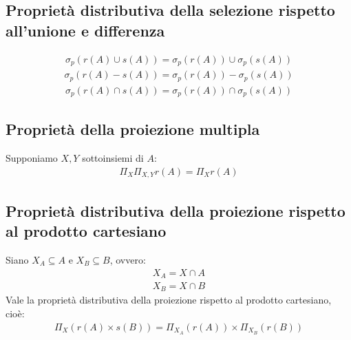 \subsection{Proprietà distributiva della selezione rispetto all'unione e differenza}
    \begin{equation}\begin{aligned}
        \sigma_p (r(A) \cup s(A)) = \sigma_p (r(A)) \cup \sigma_p (s(A))
    \end{aligned}\end{equation}
    \begin{equation}\begin{aligned}
        \sigma_p (r(A) - s(A)) = \sigma_p (r(A)) - \sigma_p (s(A))
    \end{aligned}\end{equation}
    \begin{equation}\begin{aligned}
        \sigma_p (r(A) \cap s(A)) = \sigma_p (r(A)) \cap \sigma_p (s(A))
    \end{aligned}\end{equation}

\subsection{Proprietà della proiezione multipla}
Supponiamo $X, Y$ sottoinsiemi di $A$:
    \begin{equation}\begin{aligned}
        \Pi_X \Pi_{X, Y} r(A) = \Pi_X r(A)
    \end{aligned}\end{equation}

\subsection{Proprietà distributiva della proiezione rispetto al prodotto cartesiano}
Siano $X_A \subseteq A$ e $X_B \subseteq B$, ovvero:
    \begin{equation}\begin{aligned}
        X_A = X \cap A\\
        X_B = X \cap B
    \end{aligned}\end{equation}
Vale la proprietà distributiva della proiezione rispetto al prodotto cartesiano, cioè:
    \begin{equation}\begin{aligned}
        \Pi_X (r(A) \times s(B)) = \Pi_{X_A} (r(A)) \times \Pi_{X_B} (r(B))
    \end{aligned}\end{equation}


